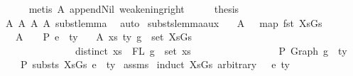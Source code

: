 \begin{isabellebody}
\ \ \ \ \isamarkupfalse%
\ {\isacharparenleft}{\kern0pt}metis\ A{}\ append{\isacharunderscore}{\kern0pt}Nil\ weakening{\isacharunderscore}{\kern0pt}right{\isacharparenright}{\kern0pt}\isanewline
\ \ \isamarkupfalse%
\ \isamarkupfalse%
\ {\isacharquery}{\kern0pt}thesis\isanewline
\ \ \ \ \isamarkupfalse%
\ A{}\ A{}\ A{}\ A{}\ subst{\isacharunderscore}{\kern0pt}lemma\ \isamarkupfalse%
\ auto\isanewline
{}\isamarkupfalse%
%
\endisatagproof
{\isafoldproof}%
%
\isadelimproof
\isanewline
%
\endisadelimproof
\isanewline
\isanewline
{}\isamarkupfalse%
\ substs{\isacharunderscore}{\kern0pt}lemma{\isacharunderscore}{\kern0pt}aux{\isacharcolon}{\kern0pt}\isanewline
\ \ \ A{}{\isacharcolon}{\kern0pt}\ {\isachardoublequoteopen}{\isasymGamma}\ {\isacharequal}{\kern0pt}\ map\ fst\ XsGs{\isachardoublequoteclose}\isanewline
\ \ \ A{}{\isacharcolon}{\kern0pt}\ {\isachardoublequoteopen}{\isasymGamma}\ {\isacharat}{\kern0pt}\ {\isasymGamma}{}\ {\isasymturnstile}{\isacharbraceleft}{\kern0pt}P{\isacharbraceright}{\kern0pt}\ e{}\ {\isacharcolon}{\kern0pt}\ ty{}{\isachardoublequoteclose}\isanewline
\ \ \ A{}{\isacharcolon}{\kern0pt}\ {\isachardoublequoteopen}{\isasymforall}{\isacharparenleft}{\kern0pt}{\isacharparenleft}{\kern0pt}xs{\isacharcomma}{\kern0pt}\ ty{\isacharparenright}{\kern0pt}{\isacharcomma}{\kern0pt}\ g{\isacharparenright}{\kern0pt}\ {\isasymin}\ set\ XsGs{\isachardot}{\kern0pt}\ {\isacharparenleft}{\kern0pt}\isanewline
\ \ \ \ \ \ \ \ \ \ \ \ \ \ \ distinct\ xs\ {\isasymand}\ FL\ g\ {\isacharequal}{\kern0pt}\ set\ xs\ {\isasymand}\isanewline
\ \ \ \ \ \ \ \ \ \ \ \ \ \ \ {\isacharbrackleft}{\kern0pt}{\isacharbrackright}{\kern0pt}\ {\isasymturnstile}{\isacharbraceleft}{\kern0pt}P{\isacharbraceright}{\kern0pt}\ Graph\ g\ {\isacharcolon}{\kern0pt}\ ty{\isacharparenright}{\kern0pt}{\isachardoublequoteclose}\isanewline
\ \ \ {\isachardoublequoteopen}{\isasymGamma}{}\ {\isasymturnstile}{\isacharbraceleft}{\kern0pt}P{\isacharbraceright}{\kern0pt}\ substs\ XsGs\ e{}\ {\isacharcolon}{\kern0pt}\ ty{}{\isachardoublequoteclose}\isanewline
%
\isadelimproof
%
\endisadelimproof
%
\isatagproof
{}\isamarkupfalse%
\ assms\isanewline
{}\isamarkupfalse%
\ {\isacharparenleft}{\kern0pt}induct\ XsGs\ arbitrary{\isacharcolon}{\kern0pt}\ {\isasymGamma}\ {\isasymGamma}{}\ e{}\ ty{}{\isacharparenright}{\kern0pt}\isanewline

\end{isabellebody}
